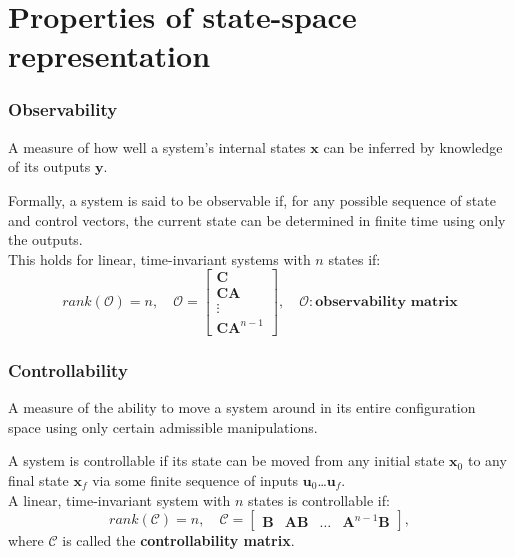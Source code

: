 \section{Properties of state-space representation}

\begin{frame}
\frametitle{Observability}
\begin{definition}
A measure of how well a system's internal states $\mathbf{x}$ can be inferred by knowledge of its outputs $\mathbf{y}$. 
\end{definition}
Formally, a system is said to be observable if, for any possible sequence of state and control vectors, the current state can be determined in finite time using only the outputs. \\
This holds for linear, time-invariant systems with $n$ states if:
\begin{equation*}
rank(\mathcal{O}) = n,\quad \mathcal{O} = \begin{bmatrix} \mathbf{C} \\ \mathbf{CA} \\ \vdots \\ \mathbf{CA}^{n-1} \end{bmatrix}, \quad \mathcal{O}: \textbf{observability matrix}
\end{equation*}
\end{frame}

\begin{frame}
\frametitle{Controllability}
\begin{definition}
A measure of the ability to move a system around in its entire configuration space using only certain admissible manipulations.
\end{definition}
A system is controllable if its state can be moved from any initial state $\mathbf{x}_0$ to any final state $\mathbf{x}_f$ via some finite sequence of inputs $\mathbf{u}_0$\ldots$\mathbf{u}_f$. \\
A linear, time-invariant system with $n$ states is controllable if:
\begin{equation*}
rank(\mathcal{C}) = n,\quad \mathcal{C} = \begin{bmatrix} \mathbf{B} & \mathbf{AB} & \ldots & \mathbf{A}^{n-1}\mathbf{B} \end{bmatrix},
\end{equation*}
where $\mathcal{C}$ is called the \textbf{controllability matrix}.

\end{frame}


